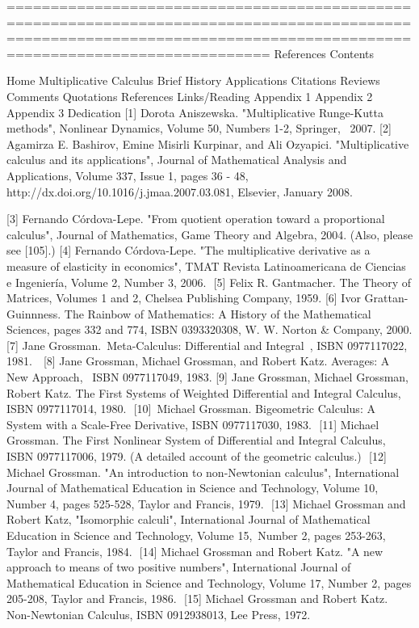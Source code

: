 \documentclass[12pt]{article}
\begin{document}
========================================================================================================================================================================
References
Contents

Home
Multiplicative Calculus
Brief History
Applications
Citations
Reviews
Comments
Quotations
References
Links/Reading
Appendix 1
Appendix 2
Appendix 3
Dedication
[1] Dorota Aniszewska. "Multiplicative Runge-Kutta methods", Nonlinear Dynamics, Volume 50, Numbers 1-2, Springer,  2007.
[2] Agamirza E. Bashirov, Emine Misirli Kurpinar, and Ali Ozyapici. "Multiplicative calculus and its applications", Journal of Mathematical Analysis and Applications, Volume 337, Issue 1, pages 36 - 48,  http://dx.doi.org/10.1016/j.jmaa.2007.03.081, Elsevier, January 2008. 

[3] Fernando Córdova-Lepe. "From quotient operation toward a proportional calculus", Journal of Mathematics, Game Theory and Algebra, 2004. (Also, please see [105].)
[4] Fernando Córdova-Lepe. "The multiplicative derivative as a measure of elasticity in economics", TMAT Revista Latinoamericana de Ciencias e Ingeniería, Volume 2, Number 3, 2006.  [5] Felix R. Gantmacher. The Theory of Matrices, Volumes 1 and 2, Chelsea Publishing Company, 1959.
[6] Ivor Grattan-Guinnness. The Rainbow of Mathematics: A History of the Mathematical Sciences, pages 332 and 774, ISBN 0393320308, W. W. Norton & Company, 2000.
[7] Jane Grossman. Meta-Calculus: Differential and Integral , ISBN 0977117022, 1981.   [8] Jane Grossman, Michael Grossman, and Robert Katz. Averages: A New Approach,  ISBN 0977117049, 1983.
[9] Jane Grossman, Michael Grossman, Robert Katz. The First Systems of Weighted Differential and Integral Calculus, ISBN 0977117014, 1980.  [10] Michael Grossman. Bigeometric Calculus: A System with a Scale-Free Derivative, ISBN 0977117030, 1983.  [11] Michael Grossman. The First Nonlinear System of Differential and Integral Calculus, ISBN 0977117006, 1979. (A detailed account of the geometric calculus.)  [12] Michael Grossman. "An introduction to non-Newtonian calculus", International Journal of Mathematical Education in Science and Technology, Volume 10, Number 4, pages 525-528, Taylor and Francis, 1979.  [13] Michael Grossman and Robert Katz, "Isomorphic calculi", International Journal of Mathematical Education in Science and Technology, Volume 15, Number 2, pages 253-263, Taylor and Francis, 1984.  [14] Michael Grossman and Robert Katz. "A new approach to means of two positive numbers", International Journal of Mathematical Education in Science and Technology, Volume 17, Number 2, pages 205-208, Taylor and Francis, 1986.  [15] Michael Grossman and Robert Katz. Non-Newtonian Calculus, ISBN 0912938013, Lee Press, 1972.
\end{document}
